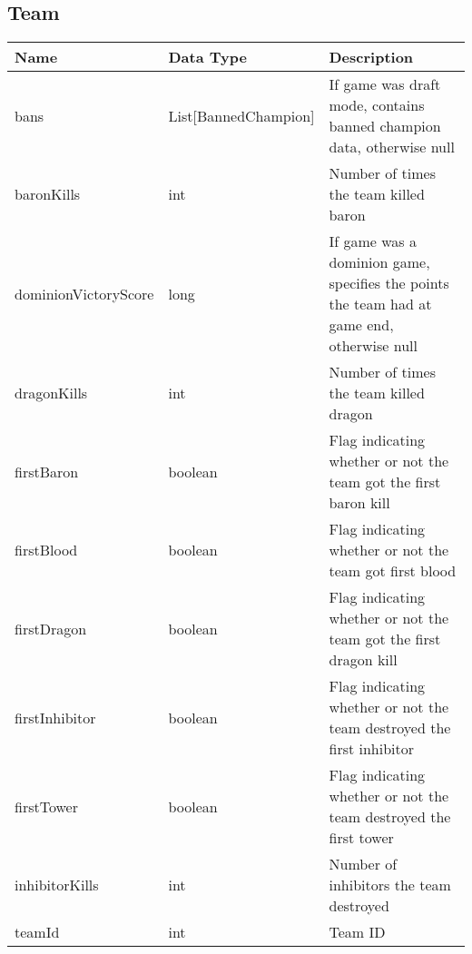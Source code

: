 \subsection{Team}
\begin{table}[!htb]
\footnotesize
\centering
\begin{tabular}{|llp{5cm}|}
\hline
\textbf{Name}        & \textbf{Data Type}       & \textbf{Description}                                                                       \\ \hline
bans                 & List{[}BannedChampion{]} & If game was draft mode, contains banned champion data, otherwise null                      \\ \hline
baronKills           & int                      & Number of times the team killed baron                                                      \\ \hline
dominionVictoryScore & long                     & If game was a dominion game, specifies the points the team had at game end, otherwise null \\ \hline
dragonKills          & int                      & Number of times the team killed dragon                                                     \\ \hline
firstBaron           & boolean                  & Flag indicating whether or not the team got the first baron kill                           \\ \hline
firstBlood           & boolean                  & Flag indicating whether or not the team got first blood                                    \\ \hline
firstDragon          & boolean                  & Flag indicating whether or not the team got the first dragon kill                          \\ \hline
firstInhibitor       & boolean                  & Flag indicating whether or not the team destroyed the first inhibitor                      \\ \hline
firstTower           & boolean                  & Flag indicating whether or not the team destroyed the first tower                          \\ \hline
inhibitorKills       & int                      & Number of inhibitors the team destroyed                                                    \\ \hline
teamId               & int                      & Team ID                                                                                    \\ \hline

\end{tabular}
\end{table}
